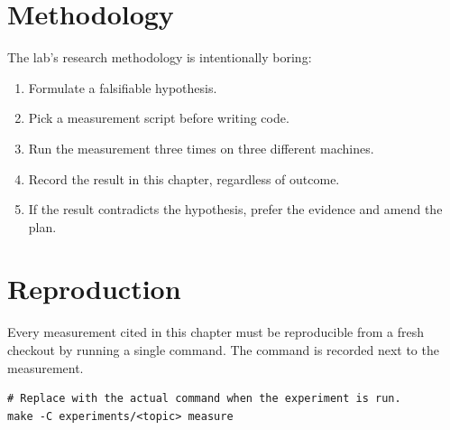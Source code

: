 \section{Methodology}

The lab's research methodology is intentionally boring:

\begin{enumerate}
  \item Formulate a falsifiable hypothesis.
  \item Pick a measurement script before writing code.
  \item Run the measurement three times on three different machines.
  \item Record the result in this chapter, regardless of outcome.
  \item If the result contradicts the hypothesis, prefer the
        evidence and amend the plan.
\end{enumerate}

\section{Reproduction}

Every measurement cited in this chapter must be reproducible from a
fresh checkout by running a single command. The command is
recorded next to the measurement.

\begin{lstlisting}[language=rccossh,caption={Reproduction stub.}]
# Replace with the actual command when the experiment is run.
make -C experiments/<topic> measure
\end{lstlisting}
